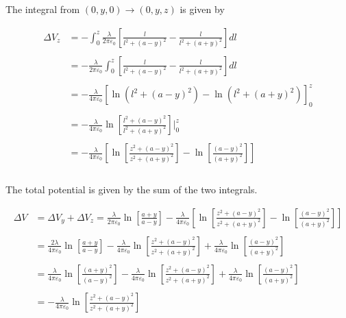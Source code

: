 \documentclass{article}
\begin{document}
The integral from $(0, y, 0) \rightarrow (0, y, z)$ is given by 

\begin{align*}
    \Delta V_z &= -\int_0^z \frac{\lambda}{2\pi\varepsilon_0} \left[ \frac{l}{l^2 + (a - y)^2} - \frac{l}{l^2 + (a + y)^2} \right] dl \\
    \\
    &= -\frac{\lambda}{2\pi\varepsilon_0} \int_0^z \left[ \frac{l}{l^2 + (a - y)^2} - \frac{l}{l^2 + (a + y)^2} \right] dl\\
    \\
    &=-\frac{\lambda}{4\pi\varepsilon_0}\left[ \ln(l^2 + (a - y)^2) - \ln(l^2 + (a + y)^2) \right]^z_0\\
    \\
    &=-\frac{\lambda}{4\pi\varepsilon_0}\ln\left[\frac{l^2 + (a - y)^2}{l^2 + (a + y)^2}\right]\bigg |^z_0\\
    \\
    &= -\frac{\lambda}{4\pi\varepsilon_0}\left[ \ln\left[\frac{z^2 + (a - y)^2}{z^2 + (a + y)^2}\right] - \ln\left[\frac{(a - y)^2}{(a + y)^2}\right]\right] \\
    \\
\end{align*}

The total potential is given by the sum of the two integrals. 

\begin{align*}
    \Delta V &= \Delta V_y + \Delta V_z =  \frac{\lambda}{2\pi \varepsilon_0} \ln\left[\frac{a + y}{a - y}\right] -\frac{\lambda}{4\pi\varepsilon_0}\left[ \ln\left[\frac{z^2 + (a - y)^2}{z^2 + (a + y)^2}\right] - \ln\left[\frac{(a - y)^2}{(a + y)^2}\right]\right] \\
    \\
    &= \frac{2\lambda}{4\pi \varepsilon_0} \ln\left[\frac{a + y}{a - y}\right] -\frac{\lambda}{4\pi\varepsilon_0}\ln\left[\frac{z^2 + (a - y)^2}{z^2 + (a + y)^2}\right] + \frac{\lambda}{4\pi\varepsilon_0}\ln\left[\frac{(a - y)^2}{(a + y)^2}\right]\\
    \\
    &= \frac{\lambda}{4\pi \varepsilon_0} \ln\left[\frac{(a + y)^2}{(a - y)^2}\right] -\frac{\lambda}{4\pi\varepsilon_0}\ln\left[\frac{z^2 + (a - y)^2}{z^2 + (a + y)^2}\right] + \frac{\lambda}{4\pi\varepsilon_0}\ln\left[\frac{(a - y)^2}{(a + y)^2}\right]\\
    \\
    &= -\frac{\lambda}{4\pi\varepsilon_0}\ln\left[\frac{z^2 + (a - y)^2}{z^2 + (a + y)^2}\right]
\end{align*}
\end{document}
